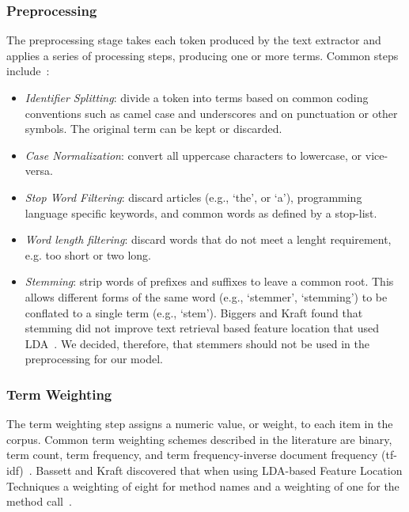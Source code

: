     \subsubsection{Preprocessing}
    The preprocessing stage takes each token produced by the text extractor
    and applies a series of processing steps, producing one or more terms.
    Common steps include~\cite{Marcus-etal:2004, Marcus-Menzies:2010}:
    \begin{itemize}
    \item \textit{Identifier Splitting}:
    divide a token into terms based on common coding conventions
    such as camel case and underscores
    and on punctuation or other symbols.
    The original term can be kept or discarded.
    \item \textit{Case Normalization}:
    convert all uppercase characters to lowercase, or vice-versa.
    \item \textit{Stop Word Filtering}:
    discard articles (e.g., ‘the’, or ‘a’),
    programming language specific keywords,
    and common words as defined by a stop-list.
    \item \textit{Word length filtering}:
    discard words that do not meet a lenght requirement,
    e.g. too short or two long.
    \item \textit{Stemming}:
    strip words of prefixes and suffixes to leave a common root.
    This allows different forms of the same word
    (e.g., ‘stemmer’, ‘stemming’)
    to be conflated to a single term
    (e.g., ‘stem’).
    Biggers and Kraft found that stemming did not improve text retrieval based feature location that used LDA~\cite{Biggers-Kraft:2012}.
    We decided,
    therefore,
    that stemmers should not be used in the preprocessing for our model.
    \end{itemize}

    \subsubsection{Term Weighting}
    The term weighting step assigns a numeric value, or weight, to each item in the corpus.
    Common term weighting schemes described in the literature are
    binary, term count, term frequency, and
    term frequency-inverse document frequency (tf-idf)~\cite{Salton:1988}.
    Bassett and Kraft discovered that when using LDA-based Feature Location Techniques a weighting of eight for method names and a weighting of one for the method call~\cite{Bassett-Kraft:2013}.

